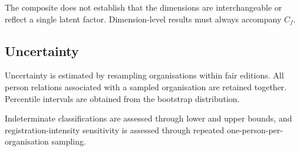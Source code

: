 The composite does not establish that the dimensions are interchangeable or
reflect a single latent factor. Dimension-level results must always accompany
$C_f$.

\subsection{Uncertainty}

Uncertainty is estimated by resampling organisations within fair editions.
All person relations associated with a sampled organisation are retained
together. Percentile intervals are obtained from the bootstrap distribution.

Indeterminate classifications are assessed through lower and upper bounds,
and registration-intensity sensitivity is assessed through repeated
one-person-per-organisation sampling.
